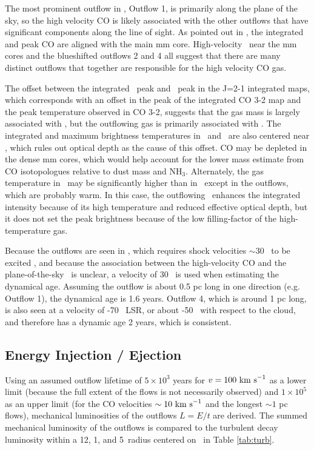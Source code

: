 The most prominent outflow in \region, Outflow 1, is primarily along
the plane of the sky, so the high velocity CO is likely associated
with the other outflows that have significant components along the line of
sight.  As pointed out in \citet{beuther2002}, the integrated and peak CO are 
aligned with the main mm core.  High-velocity \hh\ near the mm cores and the
blueshifted outflows 2 and 4 all suggest that there are many distinct outflows
that together are responsible for the high velocity CO gas.

The offset between the integrated \thirteenco\ peak and \twelveco\ peak in the 
J=2-1 integrated maps, which corresponds with an offset in the peak of the
integrated CO 3-2 map and the peak temperature observed in CO 3-2, suggests
that the gas mass is largely associated with \swcluster, but the outflowing gas
is primarily associated with \necluster.  The integrated and maximum brightness
temperatures in \thirteenco\ and \ceighteeno\ are also centered near \swcluster, 
which rules out optical depth as the cause of this offset.  CO may be depleted
in the dense mm cores, which would help account for the lower mass estimate
from CO isotopologues relative to dust mass and NH$_3$.  Alternately, the gas
temperature in \swcluster\ may be significantly higher than in \necluster\ 
except in the outflows, which are probably warm.  In this case, the outflowing
\twelveco\ enhances the integrated intensity because of its high temperature
and reduced effective optical depth, but it does not set the peak brightness
because of the low filling-factor of the high-temperature gas.

Because the outflows are seen in \hh, which requires shock velocities $\sim30$
\kms\ to be excited \citep{bally2007}, and because the association between the
high-velocity CO and the plane-of-the-sky \hh\ is unclear,  a velocity of 30
\kms\ is used when estimating the dynamical age.
Assuming the outflow is about 0.5 pc long in one direction (e.g. Outflow 1), 
the dynamical age is 1.6\ee{4} years. Outflow 4, which is around 1 pc
long, is also seen at a velocity of -70 \kms\ LSR, or about -50 \kms\ with
respect to the cloud, and therefore has a dynamic age 2\ee{4} years, which is
consistent.

\subsection{Energy Injection / Ejection}
Using an assumed outflow lifetime of $5\times10^3$ years for $v=100\ \textrm{km~s}^{-1}$ as a
lower limit (because the full extent of the flows is not necessarily observed)
and $1\times10^5$ as an upper limit (for the CO velocities $\sim10\ \textrm{km~s}^{-1}$ and
the longest $\sim1$ pc flows), mechanical luminosities of the outflows $L=E/t$
are derived.  The summed mechanical luminosity of the outflows is compared to the
turbulent decay luminosity within a 12\arcsec, 1\arcmin, and 5\arcmin\ radius
centered on \necluster\ in Table \ref{tab:turb}.  \setlength\tabcolsep{3pt}  

